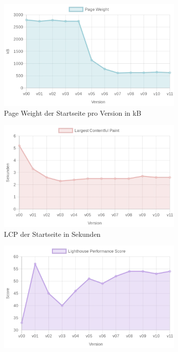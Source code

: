 \documentclass[11pt,a4paper]{article}
\begin{document}
\begin{figure}[h]
  \begin{subfigure}{.5\textwidth}
    \centering
    \includegraphics[width=.8\linewidth]{images/PageWeight.png}
    \caption{Page Weight der Startseite pro Version in kB}
    \label{fig:PageWeight}
  \end{subfigure}%
  \begin{subfigure}{.5\textwidth}
    \centering
    \includegraphics[width=.8\linewidth]{images/LCP.png}
    \caption{LCP der Startseite in Sekunden}
    \label{fig:LCP}
  \end{subfigure}
  \begin{subfigure}{.5\textwidth}
    \centering
    \includegraphics[width=.8\linewidth]{images/LH Score.png}

\end{subfigure}
\end{figure}
\end{document}
